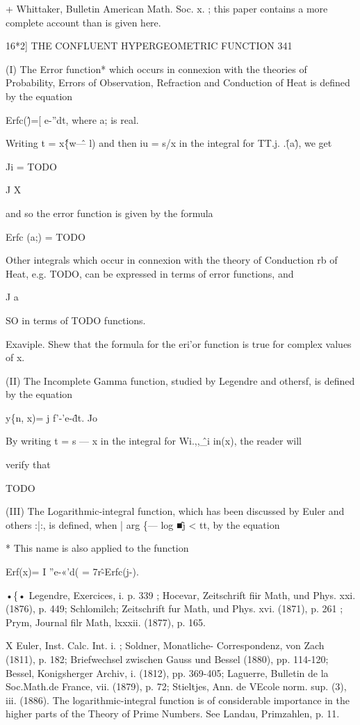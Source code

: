 + Whittaker, Bulletin American Math. Soc. x. ; this paper contains a more complete account 
than is given here. 



16*2] THE CONFLUENT HYPERGEOMETRIC FUNCTION 341 

(I) The Error function* which occurs in connexion with the theories of 
Probability, Errors of Observation, Refraction and Conduction of Heat is 
defined by the equation 

Erfc(\^)=[ e-''dt, 
where a; is real. 

Writing t = x\^\{w\^ — l) and then iu = s/x in the integral for TT.j. .\^(a\^), 
we get 

Ji 
= TODO

J X 

and so the error function is given by the formula 

Erfc (a;) = TODO

Other integrals which occur in connexion with the theory of Conduction 
rb 
of Heat, e.g. TODO, can be expressed in terms of error functions, and 

J a 

SO in terms of TODO functions. 

Exaviple. Shew that the formula for the eri'or function is true for complex values of x. 

(II) The Incomplete Gamma function, studied by Legendre and othersf, 
is defined by the equation 

y\{n, x)= j f'-'e-\^dt. 
Jo 

By writing t = s — x in the integral for Wi.,,\^\_i in(x), the reader will 

verify that 

TODO

(III) The Logarithmic-integral function, which has been discussed by 
Euler and others :|:, is defined, when | arg \{— log \^■j < tt, by the equation 

* This name is also applied to the function 

Erf(x)= I ''e-«'d( = 7r\^-Erfc(j-). 

•\{• Legendre, Exercices, i. p. 339 ; Hocevar, Zeitschrift fiir Math, und Phys. xxi. (1876), p. 449; 
Schlomilch; Zeitschrift fur Math, und Phys. xvi. (1871), p. 261 ; Prym, Journal filr Math, lxxxii. 
(1877), p. 165. 

X Euler, Inst. Calc. Int. i. ; Soldner, Monatliche- Correspondenz, von Zach (1811), p. 182; 
Briefwechsel zwischen Gauss und Bessel (1880), pp. 114-120; Bessel, Konigsherger Archiv, i. (1812), 
pp. 369-405; Laguerre, Bulletin de la Soc.Math.de France, vii. (1879), p. 72; Stieltjes, Ann. de 
VEcole norm. sup. (3), iii. (1886). The logarithmic-integral function is of considerable importance 
in the higher parts of the Theory of Prime Numbers. See Landau, Primzahlen, p. 11. 



